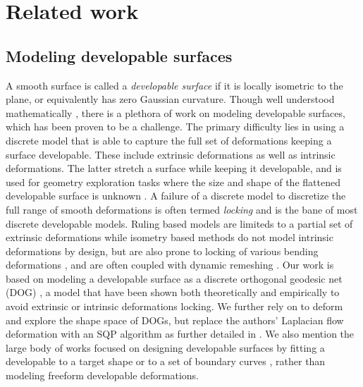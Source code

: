 \section{Related work}
\subsection{Modeling developable surfaces}
A smooth surface is called a \textit{developable surface} if it is locally isometric to the plane, or equivalently has zero Gaussian curvature. Though well understood mathematically \cite{do_carmo,spivak,computational_line}, there is a plethora of work on modeling developable surfaces, which has been proven to be a challenge. The primary difficulty lies in using a discrete model that is able to capture the full set of deformations keeping a surface developable. These include extrinsic deformations as well as intrinsic deformations. The latter stretch a surface while keeping it developable, and is used for geometry exploration tasks where the size and shape of the flattened developable surface is unknown \cite{conical,pottmann_new,rabi2018shape}. A failure of a discrete model to discretize the full range of smooth deformations is often termed \textit{locking} \cite{solomon,locking1} and is the bane of most discrete developable models. Ruling based models \cite{conical,curved_folding_kilian,pottmann_new,stein_dev,solomon} are limiteds to a partial set of extrinsic deformations while isometry based methods \cite{grin_shells,shells, goldenthal2007efficient,froh_botsch} do not model intrinsic deformations by design, but are also prone to locking of various bending deformations \cite{locking1,locking2}, and are often coupled with dynamic remeshing \cite{narain2012adaptive,StringActuated:2017,Narain,SchreckEG2017}.  Our work is based on modeling a developable surface as a discrete orthogonal geodesic net (DOG) \cite{rabi18}, a model that have been shown both theoretically and empirically to avoid extrinsic or intrinsic deformations locking. We further rely on \cite{rabi2018shape} to deform and explore the shape space of DOGs, but replace the authors' Laplacian flow deformation with an SQP algorithm as further detailed in . We also mention the large body of works focused on designing developable surfaces by fitting a developable to a target shape \cite{pottmann_approx,pottmann_new,stein_dev} or to a set of boundary curves \cite{sheffer,Frey1,Frey2,bo2019multi}, rather than modeling freeform developable deformations.

